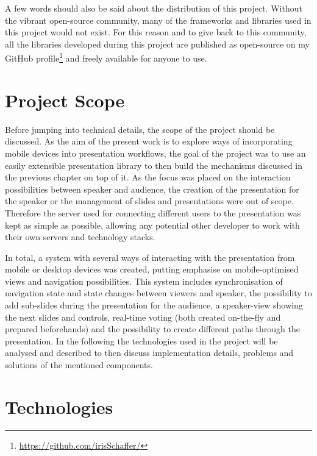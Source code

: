 A few words should also be said about the distribution of this project. Without the vibrant open-source community, many of the frameworks and libraries used in this project would not exist. For this reason and to give back to this community, all the libraries developed during this project are published as open-source on my GitHub profile\footnote{\href{https://github.com/irisSchaffer?tab=repositories}{\textsf{https://github.com/irisSchaffer/}}} and freely available for anyone to use.

\section{Project Scope}
\label{sec:implementation-scope}
Before jumping into technical details, the scope of the project should be discussed. As the aim of the present work is to explore ways of incorporating mobile devices into presentation workflows, the goal of the project was to use an easily extensible presentation library to then build the mechanisms discussed in the previous chapter on top of it.
As the focus was placed on the interaction possibilities between speaker and audience, the creation of the presentation for the speaker or the management of slides and presentations were out of scope. Therefore the server used for connecting different users to the presentation was kept as simple as possible, allowing any potential other developer to work with their own servers and technology stacks.

In total, a system with several ways of interacting with the presentation from mobile or desktop devices was created, putting emphasise on mobile-optimised views and navigation possibilities. This system includes synchronisation of navigation state and state changes between viewers and speaker, the possibility to add sub-slides during the presentation for the audience, a speaker-view showing the next slides and controls, real-time voting (both created on-the-fly and prepared beforehands) and the possibility to create different paths through the presentation. In the following the technologies used in the project will be analysed and described to then discuss implementation details, problems and solutions of the mentioned components.

\section{Technologies}
\label{sec:implementation-technologies}

